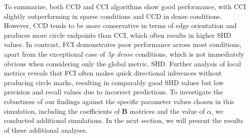 \documentclass[twoside, 11pt]{article}
\newcommand*{\figref}[2][]{%
  \hyperref[{fig:#2}]{%
    Figure~\ref*{fig:#2}%
    \ifx\\#1\\%
    \else
      #1%
    \fi
  }%
}
\begin{document}
To summarize, both CCD and CCI algorithms show good performance, with CCI slightly outperforming in sparse conditions and CCD in dense conditions. However, CCD tends to be more conservative in terms of edge orientation and produces more circle endpoints than CCI, which often results in higher SHD values. In contrast, FCI demonstrates poor performance across most conditions, apart from the exceptional case of \textit{5p dense} conditions, which is not immediately obvious when considering only the global metric, SHD. Further analysis of local metrics reveals that FCI often makes quick directional inferences without producing circle marks, resulting in comparably good SHD values but low precision and recall values due to incorrect predictions.
To investigate the robustness of our findings against the specific parameter values chosen in this simulation, including the coefficients of $\mathbf{B}$ matrices and the value of $\alpha$, we conducted additional simulations. In the next section, we will present the results of these additional analyses.

\end{document}
